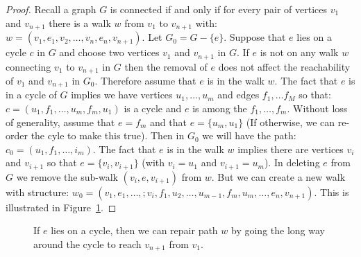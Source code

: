 \begin{proof}
Recall a graph \(G\) is connected if and only if for every pair of vertices \(v_1\) and \(v_{n+1}\) there is a walk \(w\) from \(v_1\) to  \( v_{n+1}\) with: \(w = (v_1, e_1, v_2,\dots,v_n, e_n, v_{n+1})\).
Let \(G_0 = G-\{e\}\).
Suppose that \(e\) lies on a cycle \(c\) in \(G\) and choose two vertices \(v_1\) and \(v_{n+1}\) in \(G\).
If \(e\) is not on any walk \(w\) connecting \(v_1\) to \(v_{n+1}\) in \(G\) then the removal of \(e\) does not affect the reachability of \(v_1\) and \(v_{n+1}\) in \(G_0\).
Therefore assume that \(e\) is in the walk \(w\).
The fact that \(e\) is in a cycle of \(G\) implies we have vertices \(u_1,\dots,u_m\) and edges \(f_1,\dots f_M\) so that: \(c = (u_1,f_1,\dots,u_m,f_m,u_1)\) is a cycle and \(e\) is among the \(f_1,\dots,f_m\).
Without loss of generality, assume that \(e = f_m\) and that \(e = \{u_m, u_1\}\) (If otherwise, we can re-order the cyle to make this true).
Then in \(G_0\) we will have the path: \(c_0 = (u_1, f_1,\dots,i_m)\).
The fact that \(e\) is in the walk \(w\) implies there are vertices \(v_i\) and \(v_{i+1}\) so that \(e = \{v_i, v_{i+1}\}\) (with \(v_i = u_1\) and \(v_{i+1} = u_m\)).
In deleting \(e\) from \(G\) we remove the sub-walk \((v_i, e, v_{i+1})\) from \(w\).
But we can create a new walk with structure: \(w_0 = (v_1, e_1,\dots,;\allowbreak v_i, f_1, u_2,\dots,\allowbreak u_{m-1},f_m,u_m,\dots,\allowbreak e_n,v_{n+1})\).
This is illustrated in Figure~\ref{fig:g10}.
\end{proof}
%
\begin{figure}
\centering

\caption{\label{fig:g10}%
If \(e\) lies on a cycle, then we can repair path \(w\) by going the long way around the cycle to reach \(v_{n+1}\) from \(v_1\).
}
\end{figure}
%

